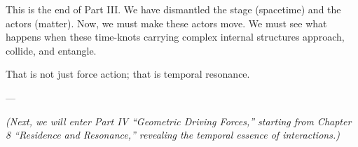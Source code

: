 This is the end of Part III. We have dismantled the stage (spacetime) and the actors (matter). Now, we must make these actors move. We must see what happens when these time-knots carrying complex internal structures approach, collide, and entangle.

That is not just force action; that is temporal resonance.

---

\textit{(Next, we will enter Part IV ``Geometric Driving Forces,'' starting from Chapter 8 ``Residence and Resonance,'' revealing the temporal essence of interactions.)}

